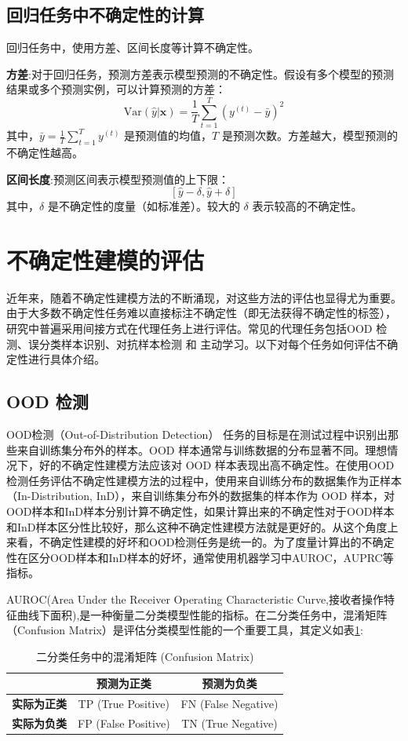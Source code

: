 \subsection{回归任务中不确定性的计算}
回归任务中，使用方差\cite{kendall2017uncertainties}、区间长度\cite{pearce2018high}等计算不确定性。

\textbf{方差}:对于回归任务，预测方差表示模型预测的不确定性。假设有多个模型的预测结果或多个预测实例，可以计算预测的方差：
\[
\text{Var}(\hat{y} | \mathbf{x}) = \frac{1}{T} \sum_{t=1}^{T} \left( y^{(t)} - \bar{y} \right)^2
\]
其中，\( \bar{y} = \frac{1}{T} \sum_{t=1}^{T} y^{(t)} \) 是预测值的均值，\( T \) 是预测次数。方差越大，模型预测的不确定性越高。

\textbf{区间长度}:预测区间表示模型预测值的上下限：
\[
[\hat{y} - \delta, \hat{y} + \delta]
\]
其中，\( \delta \) 是不确定性的度量（如标准差）。较大的 \( \delta \) 表示较高的不确定性。



\section{不确定性建模的评估}
近年来，随着不确定性建模方法的不断涌现，对这些方法的评估也显得尤为重要。由于大多数不确定性任务难以直接标注不确定性（即无法获得不确定性的标签），研究中普遍采用间接方式在代理任务上进行评估。常见的代理任务包括OOD 检测、误分类样本识别、对抗样本检测 和 主动学习。以下对每个任务如何评估不确定性进行具体介绍。

\subsection{OOD 检测}

OOD检测（Out-of-Distribution Detection） 任务的目标是在测试过程中识别出那些来自训练集分布外的样本。OOD 样本通常与训练数据的分布显著不同。理想情况下，好的不确定性建模方法应该对 OOD 样本表现出高不确定性。在使用OOD检测任务评估不确定性建模方法的过程中，使用来自训练分布的数据集作为正样本（In-Distribution, InD），来自训练集分布外的数据集的样本作为 OOD 样本，对OOD样本和InD样本分别计算不确定性，如果计算出来的不确定性对于OOD样本和InD样本区分性比较好，那么这种不确定性建模方法就是更好的。从这个角度上来看，不确定性建模的好坏和OOD检测任务是统一的。为了度量计算出的不确定性在区分OOD样本和InD样本的好坏，通常使用机器学习中AUROC，AUPRC等指标。

AUROC(Area Under the Receiver Operating Characteristic Curve,接收者操作特征曲线下面积),是一种衡量二分类模型性能的指标。在二分类任务中，混淆矩阵（Confusion Matrix）是评估分类模型性能的一个重要工具，其定义如表\ref{confusion}:
\begin{table}[H]
\centering
\begin{tabular}{|c|c|c|}
\hline
 & \textbf{预测为正类}  & \textbf{预测为负类}  \\
\hline
\textbf{实际为正类}  & TP (True Positive) & FN (False Negative) \\
\hline
\textbf{实际为负类} & FP (False Positive) & TN (True Negative) \\
\hline
\end{tabular}
\caption{二分类任务中的混淆矩阵 (Confusion Matrix)}
\label{confusion}
\end{table}

